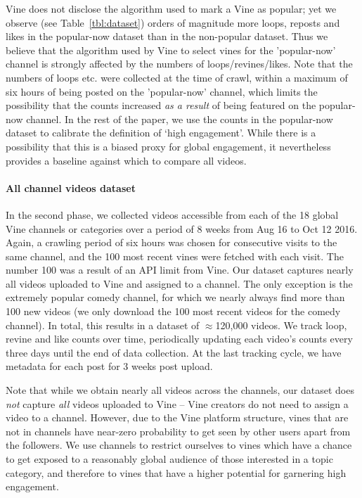 Vine does not disclose the algorithm used to mark a Vine as popular; yet we observe (see Table~\ref{tbl:dataset}) orders of magnitude more loops, reposts and likes in the popular-now dataset than in the non-popular dataset. Thus we believe that the algorithm used by Vine to select vines for the 'popular-now' channel is strongly affected by the numbers of loops/revines/likes. Note that the numbers of loops etc. were collected at the time of crawl, within a maximum of six hours of being posted on the 'popular-now' channel, which limits the possibility that the counts increased \emph{as a result} of being featured on the popular-now channel. In the rest of the paper, we use the counts in the popular-now dataset to calibrate the definition of `high engagement'. While there is a possibility that this is a biased proxy for global engagement, it nevertheless provides a baseline against which to compare all videos.

\paragraph{All channel videos dataset} In the second phase, we collected 
videos accessible from each of the 18 global Vine channels or categories%
over a period of {8 weeks} from {Aug 16 to Oct 12  2016}. Again, a crawling period of six hours was chosen for consecutive visits to the same channel, and the 100 most recent vines were fetched with each visit. The number 100 was a result of an API limit from Vine. 
Our dataset captures nearly all videos uploaded to Vine and assigned to a channel. The only exception is the extremely popular comedy channel, for which we nearly always find more than 100 new videos (we only download the 100 most recent videos for the comedy channel). In total, this results in a dataset of $\approx$120,000 videos. We track  loop, revine and like counts  over time, periodically updating each video's counts every three days until the end of  data collection. At the last tracking cycle, we have metadata for each post for  3 weeks post upload.

Note that while we obtain nearly all videos across the channels, our dataset does \emph{not} capture  \emph{all} videos uploaded to Vine -- Vine creators do not need to assign a video to a channel. However, due to the Vine platform structure,  vines that are not in channels have near-zero probability to get seen by other users apart from the followers. %
We use channels to restrict ourselves to vines which have a chance to get exposed to a reasonably global audience of those interested in a topic category, and therefore to vines that have a higher potential for garnering high engagement. 

